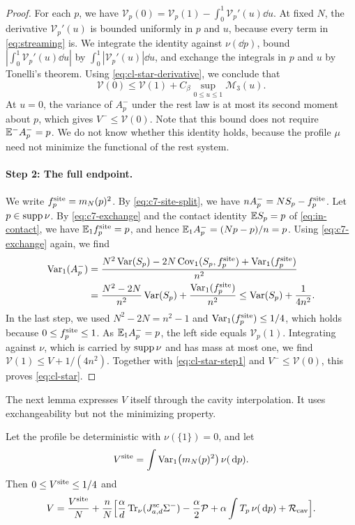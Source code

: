 \begin{proof}
For each $p$, we have
$\mathcal V_p(0)=\mathcal V_p(1)-\int_0^1\mathcal V_p'(u)\dd u$. At
fixed $N$, the derivative $\mathcal V_p'(u)$ is bounded uniformly in $p$
and $u$, because every term in \eqref{eq:streaming} is. We integrate
the identity against $\nu(\dd p)$, bound
$|\int_0^1\mathcal V_p'(u)\dd u|$ by $\int_0^1|\mathcal V_p'(u)|\dd u$,
and exchange the integrals in $p$ and $u$ by Tonelli's theorem. Using
\eqref{eq:cl-star-derivative}, we conclude that
\begin{equation}\label{eq:cl-star-step1}
 \mathcal V(0)\le\mathcal V(1)+C_\beta\sup_{0\le u\le1}\mathcal M_3(u).
\end{equation}
At $u=0$, the variance of $A^-_p$ under the rest law is at most its
second moment about $p$, which gives $V^-\le\mathcal V(0)$. Note that
this bound does not require $\mathbb E^-A^-_p=p$. We do not know whether this
identity holds, because the profile $\mu$ need not minimize the functional of
the rest system.

\paragraph{Step 2: The full endpoint.} We write
$f^{\rm site}_p=m_N(p)^2$. By \eqref{eq:c7-site-split}, we have
$nA^-_p=NS_p-f^{\rm site}_p$. Let $p\in\operatorname{supp}\nu$. By \eqref{eq:c7-exchange}
and the contact identity $\mathbb E S_p=p$ of \eqref{eq:in-contact}, we have
$\mathbb E_1f^{\rm site}_p=p$, and hence $\mathbb E_1A^-_p=(Np-p)/n=p$. Using
\eqref{eq:c7-exchange} again, we find
\[
\begin{aligned}
 \operatorname{Var}_1(A^-_p)
 &=\frac{N^2\operatorname{Var}(S_p)-2N\operatorname{Cov}_1(S_p,f^{\rm site}_p)
         +\operatorname{Var}_1(f^{\rm site}_p)}{n^2}\\
 &=\frac{N^2-2N}{n^2}\operatorname{Var}(S_p)+\frac{\operatorname{Var}_1(f^{\rm site}_p)}{n^2}
 \le\operatorname{Var}(S_p)+\frac1{4n^2}.
\end{aligned}
\]
In the last step, we used $N^2-2N=n^2-1$ and
$\operatorname{Var}_1(f^{\rm site}_p)\le1/4$, which holds because
$0\le f^{\rm site}_p\le1$. As $\mathbb E_1A^-_p=p$, the left side equals
$\mathcal V_p(1)$. Integrating against $\nu$, which is carried by
$\operatorname{supp}\nu$ and has mass at most one, we find
$\mathcal V(1)\le V+1/(4n^2)$. Together with \eqref{eq:cl-star-step1}
and $V^-\le\mathcal V(0)$, this proves \eqref{eq:cl-star}.
\end{proof}

The next lemma expresses $V$ itself through the cavity interpolation.
It uses exchangeability but not the minimizing property.

\begin{lemma}\label{lem:cav-trace}
Let the profile be deterministic with $\nu(\{1\})=0$, and let
\[
 V^{\rm site}=\int\operatorname{Var}_1\bigl(m_N(p)^2\bigr)\,\nu(\,\mathrm d p).
\]
Then $0\le V^{\rm site}\le1/4$ and
\begin{equation}\label{eq:finaltrace}
 V=\frac{V^{\rm site}}N+\frac nN\Bigl[
 \frac\alpha d\operatorname{Tr}_\nu(J^{\mathrm{sc}}_{a,d}\Sigma^-)
 -\frac\alpha2\mathcal P+\alpha\int T_p\,\nu(\,\mathrm d p)
 +\mathcal R_{\rm cav}\Bigr].
\end{equation}
\end{lemma}

